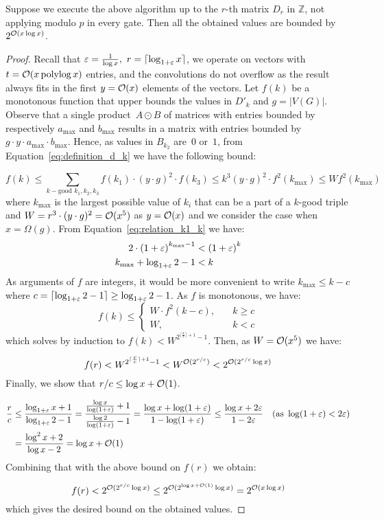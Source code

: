 \begin{lemma}
 Suppose we execute the above algorithm up to the $r$-th matrix $D_r$ in $\mathbb{Z}$, not applying modulo $p$ in every gate.
 Then all the obtained values are bounded by $2^{\mathcal{O}(x\log x)}$.
\end{lemma}
\begin{proof}

 Recall that $\varepsilon=\frac{1}{\log x},\ r=\lceil \log_{1+\varepsilon}x \rceil$, we operate on vectors with $t=\mathcal{O}(x\operatorname{polylog} x)$ entries, and the convolutions do not overflow as the result always fits in the first $y=\mathcal{O}(x)$ elements of the vectors.
 Let $f(k)$ be a monotonous function that upper bounds the values in $D'_k$ and $g=|V(G)|$. 
 Observe that a single product~$A \odot B$ of matrices with entries bounded by respectively $a_{\max}$ and $b_{\max}$ results in a matrix with entries bounded by~$g\cdot y \cdot a_{\max} \cdot b_{\max}$.
 Hence, as values in $B_{k_2}$ are~$0$ or~$1$, from Equation~\eqref{eq:definition_d_k} we have the following bound:
 
$$f(k)\leq \sum_{k-\text{good }k_1,k_2,k_3} f(k_1)\cdot (y\cdot g)^2\cdot f(k_3) \leq k^3 (y\cdot g)^2 \cdot f^2(k_{\max}) \leq W f^2(k_{\max})$$
where $k_{\max}$ is the largest possible value of $k_i$ that can be a part of a $k$-good triple and $W=r^3\cdot (y\cdot g)^2=\mathcal{O}(x^5)$ as $y=\mathcal{O}(x)$ and we consider the case when $x = \Omega(g)$.
From Equation~\eqref{eq:relation_k1_k} we have:
\begin{align*}
2\cdot\left(1+\varepsilon\right)^{k_{\max}-1} &< \left(1+\varepsilon\right)^k\\ 
k_{\max}+\log_{1+\varepsilon}2 -1 &< k
\end{align*}
As arguments of $f$ are integers, it would be more convenient to write $k_{\max} \leq k-c$ where $c=\lceil\log_{1+\varepsilon}2-1\rceil\geq\log_{1+\varepsilon}2 -1$.
As $f$ is monotonous, we have:
$$f(k) \leq 
\begin{cases}
 W \cdot f^2(k-c), &\quad k\geq c\\
 W, &\quad k < c
\end{cases}$$
which solves by induction to $f(k) < W^{2^{\lceil \frac{k}{c} \rceil+1}-1}$.
Then, as $W=\mathcal{O}(x^5)$  we have:

$$f(r) < W^{2^{\lceil \frac{r}{c} \rceil+1}-1}<W^{\mathcal{O}(2^{r/c})}<2^{\mathcal{O}(2^{r/c}\log x)}$$
Finally, we show that  $r/c \leq \log x+ \mathcal{O}(1)$.

\begin{align*}
\frac rc &\leq 
\frac{\log_{1+\varepsilon}x +1}{\log_{1+\varepsilon}2-1} =
\frac{\frac{\log x}{\log(1+\varepsilon)} + 1}{\frac{\log 2}{\log(1+\varepsilon)}-1} = 
\frac{\log x + \log(1+\varepsilon)}{1-\log(1+\varepsilon)}\leq
\frac{\log x + 2\varepsilon}{1-2\varepsilon} \quad ( \text{as } \log(1+\varepsilon)<2\varepsilon )\\
&= \frac{\log^2 x + 2}{\log x - 2} = \log x +\mathcal{O}(1)
\end{align*}
Combining that with the above bound on $f(r)$ we obtain:

$$f(r)<2^{\mathcal{O}(2^{r/c}\log x)} \leq 2^{\mathcal{O}(2^{\log x +\mathcal{O}(1)}\log x)}= 2^{\mathcal{O}(x\log x)}$$
which gives the desired bound on the obtained values.
\end{proof}
